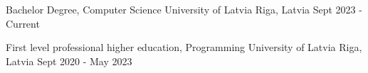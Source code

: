 

\begin{cventries}

  \cventry
    {Bachelor Degree, Computer Science} %
    {University of Latvia} %
    {Riga, Latvia} %
    {Sept 2023 - Current} %
    {
      \begin{cvitems} %
      \end{cvitems}
    }
    
  \cventry
    {First level professional higher education, Programming} %
    {University of Latvia} %
    {Riga, Latvia} %
    {Sept 2020 - May 2023} %
    {
      \begin{cvitems} %
      \end{cvitems}
    }
\end{cventries}
